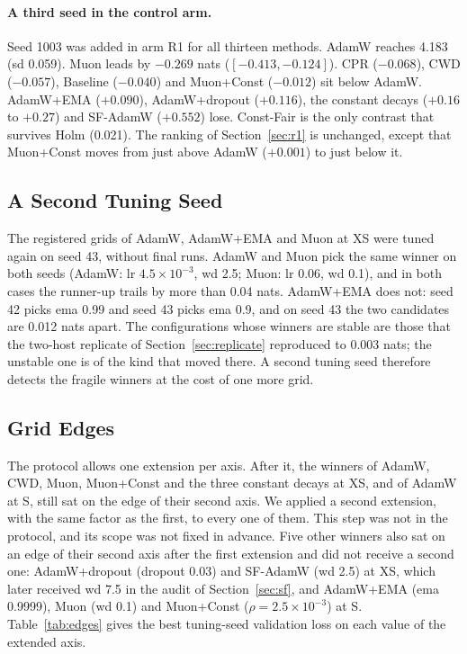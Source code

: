 \documentclass[twoside,11pt]{article}
\begin{document}
\paragraph{A third seed in the control arm.}
Seed 1003 was added in arm R1 for all thirteen methods. AdamW reaches 4.183 (sd 0.059). Muon leads by $-0.269$ nats ($[-0.413, -0.124]$). CPR ($-0.068$), CWD ($-0.057$), Baseline ($-0.040$) and Muon+Const ($-0.012$) sit below AdamW. AdamW+EMA ($+0.090$), AdamW+dropout ($+0.116$), the constant decays ($+0.16$ to $+0.27$) and SF-AdamW ($+0.552$) lose. Const-Fair is the only contrast that survives Holm (0.021). The ranking of Section~\ref{sec:r1} is unchanged, except that Muon+Const moves from just above AdamW ($+0.001$) to just below it.

\subsection{A Second Tuning Seed}
\label{sec:tune43}

The registered grids of AdamW, AdamW+EMA and Muon at XS were tuned again on seed 43, without final runs. AdamW and Muon pick the same winner on both seeds (AdamW: lr $4.5\times10^{-3}$, wd 2.5; Muon: lr 0.06, wd 0.1), and in both cases the runner-up trails by more than 0.04 nats. AdamW+EMA does not: seed 42 picks ema 0.99 and seed 43 picks ema 0.9, and on seed 43 the two candidates are 0.012 nats apart. The configurations whose winners are stable are those that the two-host replicate of Section~\ref{sec:replicate} reproduced to 0.003 nats; the unstable one is of the kind that moved there. A second tuning seed therefore detects the fragile winners at the cost of one more grid.

\subsection{Grid Edges}
\label{sec:edges}

The protocol allows one extension per axis. After it, the winners of AdamW, CWD, Muon, Muon+Const and the three constant decays at XS, and of AdamW at S, still sat on the edge of their second axis. We applied a second extension, with the same factor as the first, to every one of them. This step was not in the protocol, and its scope was not fixed in advance. Five other winners also sat on an edge of their second axis after the first extension and did not receive a second one: AdamW+dropout (dropout 0.03) and SF-AdamW (wd 2.5) at XS, which later received wd 7.5 in the audit of Section~\ref{sec:sf}, and AdamW+EMA (ema 0.9999), Muon (wd 0.1) and Muon+Const ($\rho = 2.5\times10^{-3}$) at S. Table~\ref{tab:edges} gives the best tuning-seed validation loss on each value of the extended axis.
\end{document}
